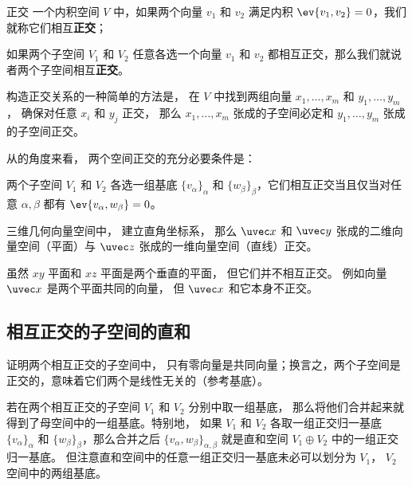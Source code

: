 
\begin{issues}
\issueTODO
\end{issues}



\begin{definition}{正交}
一个内积空间 $V$ 中，如果两个向量 ${v_1}$ 和 ${v_2}$ 满足内积 $\ev{v_1, v_2} = 0$，我们就称它们相互\textbf{正交}；

如果两个子空间 $V_1$ 和 $V_2$ 任意各选一个向量 ${v_1}$ 和 ${v_2}$ 都相互正交，那么我们就说者两个子空间相互\textbf{正交}。
\end{definition}

构造正交关系的一种简单的方法是， 在 $V$ 中找到两组向量 $x_1, \dots, x_m$ 和 $y_1, \dots, y_m$， 确保对任意 $x_i$ 和 $y_j$ 正交， 那么 $x_1, \dots, x_m$ 张成的子空间必定和 $y_1, \dots, y_m$ 张成的子空间正交。

从的角度来看， 两个空间正交的充分必要条件是：
\begin{theorem}{}
两个子空间 $V_1$ 和 $V_2$ 各选一组基底 $\{v_\alpha\}_\alpha$ 和 $\{w_\beta\}_\beta$，它们相互正交当且仅当对任意 $\alpha, \beta$ 都有 $\ev{v_\alpha, w_\beta} = 0$。
\end{theorem}

\begin{example}{}
三维几何向量空间中， 建立直角坐标系， 那么 $\uvec x$ 和 $\uvec y$ 张成的二维向量空间（平面）与 $\uvec z$ 张成的一维向量空间（直线）正交。

虽然 $xy$ 平面和 $xz$ 平面是两个垂直的平面， 但它们并不相互正交。 例如向量 $\uvec x$ 是两个平面共同的向量， 但 $\uvec x$ 和它本身不正交。
\end{example}

\subsection{相互正交的子空间的直和}

\begin{exercise}{}
证明两个相互正交的子空间中， 只有零向量是共同向量；换言之，两个子空间是正交的，意味着它们两个是线性无关的（参考基底）。
\end{exercise}

若在两个相互正交的子空间 $V_1$ 和 $V_2$ 分别中取一组基底， 那么将他们合并起来就得到了母空间中的一组基底。特别地， 如果 $V_1$ 和 $V_2$ 各取一组正交归一基底 $\{v_\alpha\}_\alpha$ 和 $\{w_\beta\}_\beta$，那么合并之后 $\{v_\alpha, w_\beta\}_{\alpha, \beta}$ 就是直和空间 $V_1 \oplus V_2$ 中的一组正交归一基底。 但注意直和空间中的任意一组正交归一基底未必可以划分为 $V_1$， $V_2$ 空间中的两组基底。

